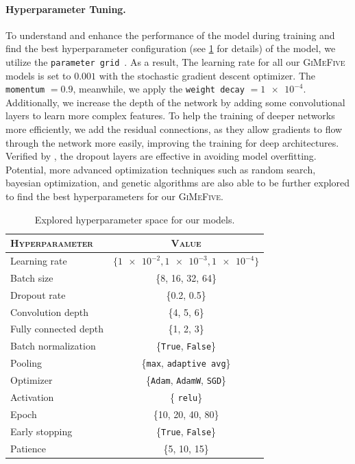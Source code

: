 \paragraph{Hyperparameter Tuning.}
To understand and enhance the performance of the model during training 
and find the best hyperparameter configuration (see \cref{tab:hyper} for details) of the model, 
we utilize the \texttt{parameter grid}~\cite{parameterGrid}. 
As a result, 
The learning rate for all our \textsc{GiMeFive} models is set to $0.001$ with the stochastic gradient descent optimizer. 
The \texttt{momentum} $=0.9$, 
meanwhile, we apply the \texttt{weight decay} $ = \num{1e-4}$. 
Additionally, 
we increase the depth of the network by adding some convolutional layers to learn more complex features. 
To help the training of deeper networks more efficiently, 
we add the residual connections, 
as they allow gradients to flow through the network more easily, 
improving the training for deep architectures. 
Verified by \citet{BarsoumZCZ16}, 
the dropout layers are effective in avoiding model overfitting. 
Potential, 
more advanced optimization techniques such as random search, bayesian optimization, 
and genetic algorithms are also able to be further explored to find the best hyperparameters for our \textsc{GiMeFive}.

\begin{table}[ht]
  \centering
  \begin{tabular}{@{}lc@{}}
    \toprule
    \textsc{Hyperparameter} & \textsc{Value} \\
    \midrule
    Learning rate & $ \{\num{1e-2}, \num{1e-3}, \num{1e-4} \} $ \\
    Batch size & \{8, 16, 32, 64\} \\
    Dropout rate & \{0.2, 0.5\} \\
    Convolution depth & \{4, 5, 6\} \\
    Fully connected depth & \{1, 2, 3\} \\
    Batch normalization & \{\texttt{True}, \texttt{False}\} \\
    Pooling & \{\texttt{max}, \texttt{adaptive avg}\} \\
    Optimizer & \{\texttt{Adam}, \texttt{AdamW}, \texttt{SGD}\} \\
    Activation & \{ \texttt{relu}\} \\ %
    Epoch & \{10, 20, 40, 80\} \\
    Early stopping & \{\texttt{True}, \texttt{False}\} \\
    Patience & \{5, 10, 15\} \\
    \bottomrule
  \end{tabular}
  \caption{Explored hyperparameter space for our models.}
  \label{tab:hyper}
\end{table}

